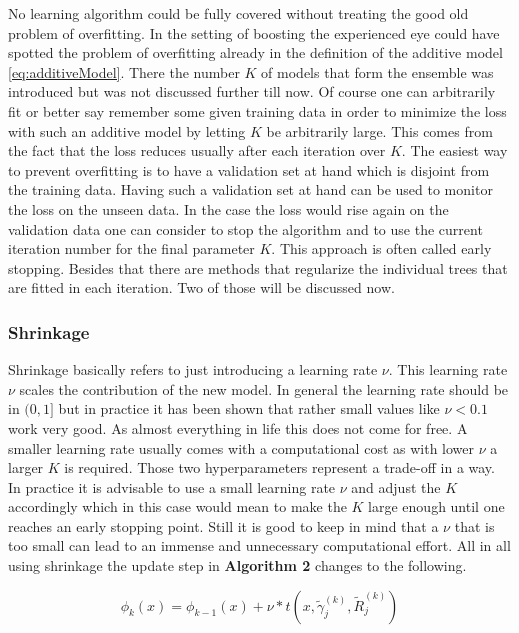 \documentclass[
]{book}
\begin{document}
No learning algorithm could be fully covered without treating the good old problem of overfitting. In the setting of boosting the experienced eye could have spotted the problem of overfitting already in the definition of the additive model \eqref{eq:additiveModel}. There the number \(K\) of models that form the ensemble was introduced but was not discussed further till now. Of course one can arbitrarily fit or better say remember some given training data in order to minimize the loss with such an additive model by letting \(K\) be arbitrarily large. This comes from the fact that the loss reduces usually after each iteration over \(K\).\citep{elements} The easiest way to prevent overfitting is to have a validation set at hand which is disjoint from the training data. Having such a validation set at hand can be used to monitor the loss on the unseen data. In the case the loss would rise again on the validation data one can consider to stop the algorithm and to use the current iteration number for the final parameter \(K\). This approach is often called early stopping. Besides that there are methods that regularize the individual trees that are fitted in each iteration. Two of those will be discussed now.

\hypertarget{shrinkage}{%
\subsubsection{Shrinkage}\label{shrinkage}}

Shrinkage basically refers to just introducing a learning rate \(\nu\). This learning rate \(\nu\) scales the contribution of the new model. In general the learning rate should be in \((0,1]\) but in practice it has been shown that rather small values like \(\nu < 0.1\) work very good.\citep{elements} As almost everything in life this does not come for free. A smaller learning rate usually comes with a computational cost as with lower \(\nu\) a larger \(K\) is required. Those two hyperparameters represent a trade-off in a way. In practice it is advisable to use a small learning rate \(\nu\) and adjust the \(K\) accordingly which in this case would mean to make the \(K\) large enough until one reaches an early stopping point. Still it is good to keep in mind that a \(\nu\) that is too small can lead to an immense and unnecessary computational effort. All in all using shrinkage the update step in \textbf{Algorithm 2} changes to the following.

\begin{equation}
  \phi_k(x) = \phi_{k-1}(x) + \nu * t(x,\tilde {\gamma}^{(k)}_{j},\tilde{R}^{(k)}_j)
  \label{eq:shrinkage}
\end{equation}
\end{document}
